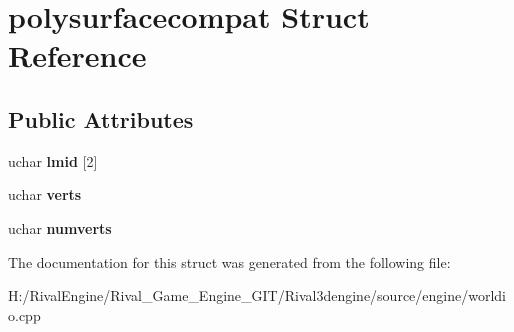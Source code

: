 \hypertarget{structpolysurfacecompat}{}\section{polysurfacecompat Struct Reference}
\label{structpolysurfacecompat}
\subsection*{Public Attributes}
\begin{DoxyCompactItemize}
\item 
\mbox{\label{structpolysurfacecompat_aca8c44faa5ad0960cd4279781ffb8583}} 
uchar {\bfseries lmid} \mbox{[}2\mbox{]}
\item 
\mbox{\label{structpolysurfacecompat_a16715a8f1ec6437f307344ecd9bd4fd1}} 
uchar {\bfseries verts}
\item 
\mbox{\label{structpolysurfacecompat_a25e74940b2ebf55bdcca39d86e64d29e}} 
uchar {\bfseries numverts}
\end{DoxyCompactItemize}


The documentation for this struct was generated from the following file\+:\begin{DoxyCompactItemize}
\item 
H\+:/\+Rival\+Engine/\+Rival\+\_\+\+Game\+\_\+\+Engine\+\_\+\+G\+I\+T/\+Rival3dengine/source/engine/worldio.\+cpp\end{DoxyCompactItemize}
